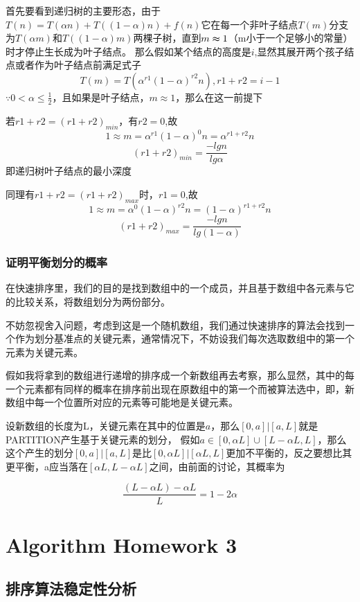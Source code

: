 \documentclass[cn,11pt,chinese]{elegantbook}
\begin{document}
首先要看到递归树的主要形态，由于$T(n) = T(\alpha n)+T((1-\alpha )n)+f(n)$它在每一个非叶子结点$T(m)$分支为$T(\alpha m)$和$T((1-\alpha )m)$两棵子树，直到$m\thickapprox 1$（m小于一个足够小的常量）时才停止生长成为叶子结点。
那么假如某个结点的高度是$i$,显然其展开两个孩子结点或者作为叶子结点前满足式子
$$T(m) = T(\alpha ^{r1} (1-\alpha )^{r2} n),r1+r2 = i-1$$
$\because 0< \alpha \le \frac{1}{2} $，且如果是叶子结点，$m \approx 1$，那么在这一前提下

若$r1+r2 = (r1+r2)_{min}$，有$r2=0$,故
$$1\approx m = \alpha ^{r1} (1-\alpha )^{0} n = \alpha^{r1+r2} n$$
$$(r1+r2)_{min} = \frac{-lgn}{lg\alpha } $$
即递归树叶子结点的最小深度

同理有$r1+r2 = (r1+r2)_{max}$时，$r1=0$,故
$$1\approx m = \alpha ^{0} (1-\alpha )^{r2} n = (1-\alpha )^{r1+r2} n$$
$$(r1+r2)_{max} = \frac{-lgn}{lg(1-\alpha )} $$

\subsection{证明平衡划分的概率}

在快速排序里，我们的目的是找到数组中的一个成员，并且基于数组中各元素与它的比较关系，将数组划分为两份部分。

不妨忽视舍入问题，考虑到这是一个随机数组，我们通过快速排序的算法会找到一个作为划分基准点的关键元素，通常情况下，不妨设我们每次选取数组中的第一个元素为关键元素。

假如我将拿到的数组进行递增的排序成一个新数组再去考察，那么显然，其中的每一个元素都有同样的概率在排序前出现在原数组中的第一个而被算法选中，即，新数组中每一个位置所对应的元素等可能地是关键元素。

设新数组的长度为L，关键元素在其中的位置是$a$，那么$[0,a]|[a,L]$就是PARTITION产生基于关键元素的划分，
假如$a\in [0,\alpha L] \cup [L-\alpha L ,L]$，那么这个产生的划分$[0,a]|[a,L]$是比$[0,\alpha L]|[\alpha L,L]$更加不平衡的，反之要想比其更平衡，a应当落在$[\alpha L,L-\alpha L]$之间，由前面的讨论，其概率为

$$\frac{(L-\alpha L) - \alpha L}{L} = 1-2\alpha $$

\chapter{Algorithm Homework 3}

\section{排序算法稳定性分析}
\end{document}
